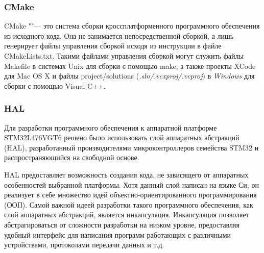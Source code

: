 

\subsubsection{CMake}

CMake ""--- это система сборки кроссплатформенного программного обеспечения из 
исходного кода. 
Она не занимается непосредственной сборкой, а лишь генерирует файлы управления 
сборкой исходя из инструкции в файле CMakeLists.txt.
Такими файлами управления сборкой могут служить файлы Makefile в системах Unix 
для сборки с помощью make, а также проекты XCode для Mac OS X и файлы 
project/solutions (\textit{.sln/.vcxproj/.vcproj}) в \textit{Windows} для 
сборки с помощью Visual C++.



\subsubsection{HAL}

Для разработки программного обеспечения к аппаратной платформе STM32L476VGT6 
решено было использовать слой аппаратных абстракций (HAL), разработанный 
производителями микроконтроллеров семейства STM32 и распространяющийся на 
свободной основе.

HAL предоставляет возможность создания кода, не зависящего от аппаратных 
особенностей выбранной платформы. 
Хотя данный слой написан на языке Си, он реализует в себе множество идей 
объектно-ориентированного программирования (ООП). 
Самой важной идеей разработки такого программного обеспечения, как слой 
аппаратных абстракций, является инкапсуляция.
Инкапсуляция позволяет абстрагироваться от сложности разработки на низком 
уровне, предоставляя удобный интерфейс для написания программ работающих с 
различными устройствами, протоколами передачи данных и т.д.

